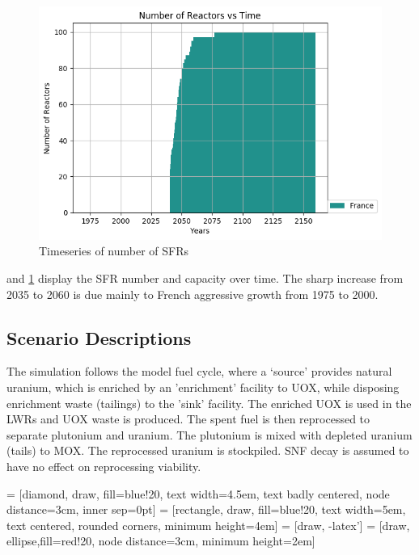 \begin{figure}[htbp!]
	\begin{center}
		\includegraphics[scale=0.7]{./images/french-transition/number_plot.png}
	\end{center}
	\caption{Timeseries of number of \gls{SFR}s}
	\label{fig:sfr_num}
\end{figure}


 and \cref{fig:sfr_num} display
the \gls{SFR} number and capacity over time.
The sharp increase from 2035 to 2060 is due mainly to
French aggressive growth from 1975 to 2000.

\subsection{Scenario Descriptions}
The simulation follows the model fuel cycle, where a `source'
provides natural uranium, which is enriched by an 'enrichment'
facility to \gls{UOX}, while disposing enrichment waste (tailings)
to the 'sink' facility. The enriched \gls{UOX} is used
in the \gls{LWR}s and \gls{UOX} waste is produced. The spent fuel
is then reprocessed to separate plutonium and uranium.
The plutonium is mixed with depleted uranium (tails) to \gls{MOX}.
The reprocessed uranium is stockpiled. \gls{SNF} decay is assumed
to have no effect on reprocessing viability.


 = [diamond, draw, fill=blue!20, 
text width=4.5em, text badly centered, node distance=3cm, inner sep=0pt]
 = [rectangle, draw, fill=blue!20, 
text width=5em, text centered, rounded corners, minimum height=4em]
 = [draw, -latex']
 = [draw, ellipse,fill=red!20, node distance=3cm,
minimum height=2em]


